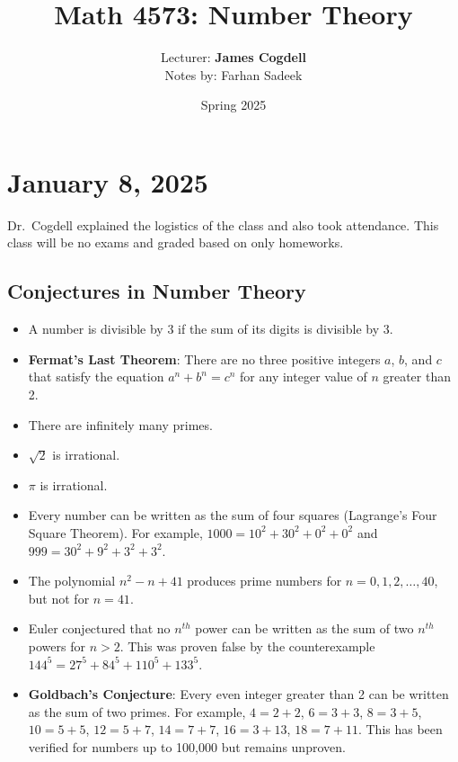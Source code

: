 \documentclass[11pt]{article}
\title{Math 4573: Number Theory}
\author{Lecturer: \textbf{James Cogdell}\\Notes by: Farhan Sadeek}
\date{Spring 2025}
\begin{document}
\maketitle

\section{January 8, 2025}

Dr.\ Cogdell explained the logistics of the class and also took attendance.
This class will be no exams and graded based on only homeworks.

\subsection{Conjectures in Number Theory}
\begin{itemize}
    \item A number is divisible by 3 if the sum of its digits is divisible by 3.
    \item \textbf{Fermat's Last Theorem}: There are no three positive integers $a$, $b$, and $c$ that satisfy the equation $a^n + b^n = c^n$ for any integer value of $n$ greater than 2.
    \item There are infinitely many primes.
    \item $\sqrt{2}$ is irrational.
    \item $\pi$ is irrational.
    \item Every number can be written as the sum of four squares (Lagrange's Four Square
          Theorem). For example, $1000 = 10^2 + 30^2 + 0^2 + 0^2$ and $999 = 30^2 + 9^2 +
              3^2 + 3^2$.
    \item The polynomial $n^2 - n + 41$ produces prime numbers for $n = 0, 1, 2, \ldots,
              40$, but not for $n = 41$.
    \item Euler conjectured that no $n^{th}$ power can be written as the sum of two
          $n^{th}$ powers for $n > 2$. This was proven false by the counterexample $144^5
              = 27^5 + 84^5 + 110^5 + 133^5$.
    \item \textbf{Goldbach's Conjecture}: Every even integer greater than 2 can be written as the sum of two primes. For example, $4 = 2 + 2$, $6 = 3 + 3$, $8 = 3 + 5$, $10 = 5 + 5$, $12 = 5 + 7$, $14 = 7 + 7$, $16 = 3 + 13$, $18 = 7 + 11$. This has been verified for numbers up to 100,000 but remains unproven.
\end{itemize}
\end{document}
